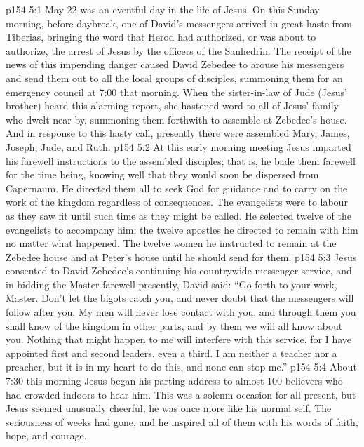 \vs p154 5:1 May 22 was an eventful day in the life of Jesus. On this Sunday morning, before daybreak, one of David’s messengers arrived in great haste from Tiberias, bringing the word that Herod had authorized, or was about to authorize, the arrest of Jesus by the officers of the Sanhedrin. The receipt of the news of this impending danger caused David Zebedee to arouse his messengers and send them out to all the local groups of disciples, summoning them for an emergency council at 7:00 that morning. When the sister\hyp{}in\hyp{}law of Jude (Jesus’ brother) heard this alarming report, she hastened word to all of Jesus’ family who dwelt near by, summoning them forthwith to assemble at Zebedee’s house. And in response to this hasty call, presently there were assembled Mary, James, Joseph, Jude, and Ruth.
\vs p154 5:2 At this early morning meeting Jesus imparted his farewell instructions to the assembled disciples; that is, he bade them farewell for the time being, knowing well that they would soon be dispersed from Capernaum. He directed them all to seek God for guidance and to carry on the work of the kingdom regardless of consequences. The evangelists were to labour as they saw fit until such time as they might be called. He selected twelve of the evangelists to accompany him; the twelve apostles he directed to remain with him no matter what happened. The twelve women he instructed to remain at the Zebedee house and at Peter’s house until he should send for them.
\vs p154 5:3 Jesus consented to David Zebedee’s continuing his countrywide messenger service, and in bidding the Master farewell presently, David said: “Go forth to your work, Master. Don’t let the bigots catch you, and never doubt that the messengers will follow after you. My men will never lose contact with you, and through them you shall know of the kingdom in other parts, and by them we will all know about you. Nothing that might happen to me will interfere with this service, for I have appointed first and second leaders, even a third. I am neither a teacher nor a preacher, but it is in my heart to do this, and none can stop me.”
\vs p154 5:4 About 7:30 this morning Jesus began his parting address to almost 100 believers who had crowded indoors to hear him. This was a solemn occasion for all present, but Jesus seemed unusually cheerful; he was once more like his normal self. The seriousness of weeks had gone, and he inspired all of them with his words of faith, hope, and courage.
